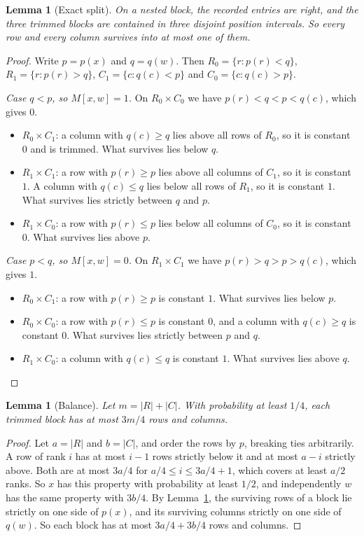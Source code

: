 \documentclass[11pt]{article}
\newtheorem{lemma}[theorem]{Lemma}
\theoremstyle{remark}
\begin{document}
\begin{lemma}[Exact split]\label{lem:split}
On a nested block, the recorded entries are right, and the three trimmed blocks are contained in three disjoint position intervals. So every row and every column survives into at most one of them.
\end{lemma}
\begin{proof}
Write $p=p(x)$ and $q=q(w)$. Then $R_0=\{r:p(r)<q\}$, $R_1=\{r:p(r)>q\}$, $C_1=\{c:q(c)<p\}$ and $C_0=\{c:q(c)>p\}$.

\emph{Case $q<p$, so $M[x,w]=1$.} On $R_0\times C_0$ we have $p(r)<q<p<q(c)$, which gives $0$.
\begin{itemize}[leftmargin=1.5em]
\item $R_0\times C_1$: a column with $q(c)\ge q$ lies above all rows of $R_0$, so it is constant $0$ and is trimmed. What survives lies below $q$.
\item $R_1\times C_1$: a row with $p(r)\ge p$ lies above all columns of $C_1$, so it is constant $1$. A column with $q(c)\le q$ lies below all rows of $R_1$, so it is constant $1$. What survives lies strictly between $q$ and $p$.
\item $R_1\times C_0$: a row with $p(r)\le p$ lies below all columns of $C_0$, so it is constant $0$. What survives lies above $p$.
\end{itemize}

\emph{Case $p<q$, so $M[x,w]=0$.} On $R_1\times C_1$ we have $p(r)>q>p>q(c)$, which gives $1$.
\begin{itemize}[leftmargin=1.5em]
\item $R_0\times C_1$: a row with $p(r)\ge p$ is constant $1$. What survives lies below $p$.
\item $R_0\times C_0$: a row with $p(r)\le p$ is constant $0$, and a column with $q(c)\ge q$ is constant $0$. What survives lies strictly between $p$ and $q$.
\item $R_1\times C_0$: a column with $q(c)\le q$ is constant $1$. What survives lies above $q$.\qedhere
\end{itemize}
\end{proof}

\begin{lemma}[Balance]\label{lem:balance}
Let $m=|R|+|C|$. With probability at least $1/4$, each trimmed block has at most $3m/4$ rows and columns.
\end{lemma}
\begin{proof}
Let $a=|R|$ and $b=|C|$, and order the rows by $p$, breaking ties arbitrarily. A row of rank $i$ has at most $i-1$ rows strictly below it and at most $a-i$ strictly above. Both are at most $3a/4$ for $a/4\le i\le 3a/4+1$, which covers at least $a/2$ ranks. So $x$ has this property with probability at least $1/2$, and independently $w$ has the same property with $3b/4$. By Lemma~\ref{lem:split}, the surviving rows of a block lie strictly on one side of $p(x)$, and its surviving columns strictly on one side of $q(w)$. So each block has at most $3a/4+3b/4$ rows and columns.
\end{proof}
\end{document}
